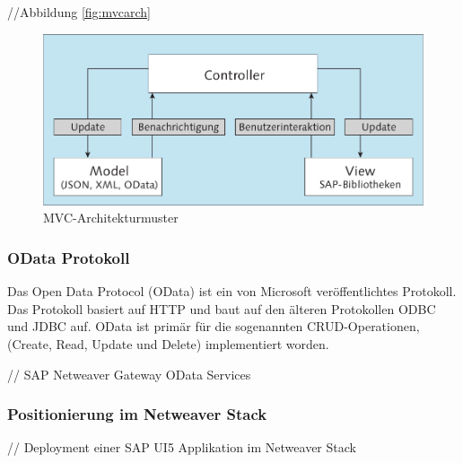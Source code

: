 //Abbildung \ref{fig:mvcarch}\\	
\begin{figure}[htb]
  \centering
  \includegraphics[width=0.7\linewidth]{abb/mvc_arch2}
  \caption[MVC-Architekturmuster]{MVC-Architekturmuster\footnotemark}
  \label{fig:mvcarch2}
\end{figure}

\subsubsection{OData Protokoll}
\glqq Das Open Data Protocol (OData) ist ein von Microsoft veröffentlichtes Protokoll. Das Protokoll basiert auf HTTP und baut auf den älteren Protokollen ODBC und JDBC auf. OData ist primär für die sogenannten CRUD-Operationen, (Create, Read, Update und Delete) implementiert worden.\grqq{}\cite[S.168]{AntoEinf2014}

// SAP Netweaver Gateway OData Services\\

\subsubsection{Positionierung im Netweaver Stack}
// Deployment einer SAP UI5 Applikation im Netweaver Stack